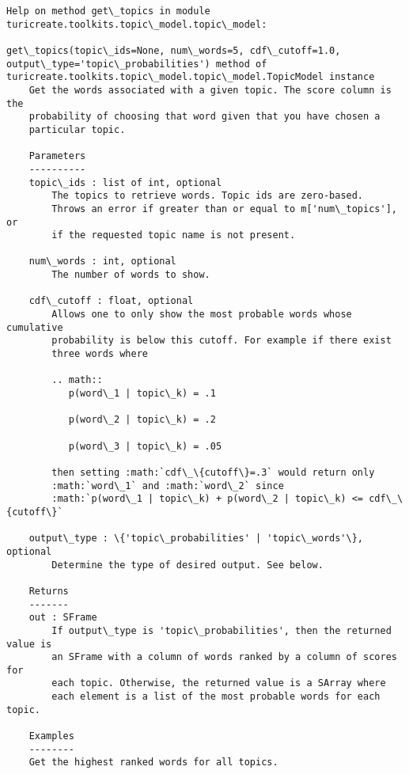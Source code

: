 \documentclass[11pt]{ctexart}
\begin{document}
    \begin{Verbatim}[commandchars=\\\{\}]
Help on method get\_topics in module turicreate.toolkits.topic\_model.topic\_model:

get\_topics(topic\_ids=None, num\_words=5, cdf\_cutoff=1.0, output\_type='topic\_probabilities') method of turicreate.toolkits.topic\_model.topic\_model.TopicModel instance
    Get the words associated with a given topic. The score column is the
    probability of choosing that word given that you have chosen a
    particular topic.
    
    Parameters
    ----------
    topic\_ids : list of int, optional
        The topics to retrieve words. Topic ids are zero-based.
        Throws an error if greater than or equal to m['num\_topics'], or
        if the requested topic name is not present.
    
    num\_words : int, optional
        The number of words to show.
    
    cdf\_cutoff : float, optional
        Allows one to only show the most probable words whose cumulative
        probability is below this cutoff. For example if there exist
        three words where
    
        .. math::
           p(word\_1 | topic\_k) = .1
    
           p(word\_2 | topic\_k) = .2
    
           p(word\_3 | topic\_k) = .05
    
        then setting :math:`cdf\_\{cutoff\}=.3` would return only
        :math:`word\_1` and :math:`word\_2` since
        :math:`p(word\_1 | topic\_k) + p(word\_2 | topic\_k) <= cdf\_\{cutoff\}`
    
    output\_type : \{'topic\_probabilities' | 'topic\_words'\}, optional
        Determine the type of desired output. See below.
    
    Returns
    -------
    out : SFrame
        If output\_type is 'topic\_probabilities', then the returned value is
        an SFrame with a column of words ranked by a column of scores for
        each topic. Otherwise, the returned value is a SArray where
        each element is a list of the most probable words for each topic.
    
    Examples
    --------
    Get the highest ranked words for all topics.
    

\end{Verbatim}
\end{document}
